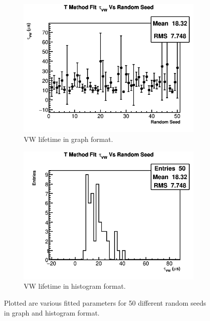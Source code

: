 \begin{figure}[]
	   	\begin{subfigure}[t]{0.45\textwidth}
		    \centering
			\includegraphics[width=\textwidth]{TMethod_tau_VW_Vs_Iter_Canv}
		    \caption{VW lifetime in graph format.}
	    \end{subfigure}
	    \hspace{4mm}
	    \begin{subfigure}[t]{0.45\textwidth}
		    \centering
			\includegraphics[width=\textwidth]{TMethod_tau_VW_Vs_Iter_Canv_hist}
		    \caption{VW lifetime in histogram format.}
	    \end{subfigure}%
	\caption[TMethodRandomSeedsPars6]{Plotted are various fitted parameters for 50 different random seeds in graph and histogram format.}
	\label{fig:TMethodRandomSeedsPars6}
	\end{figure}


